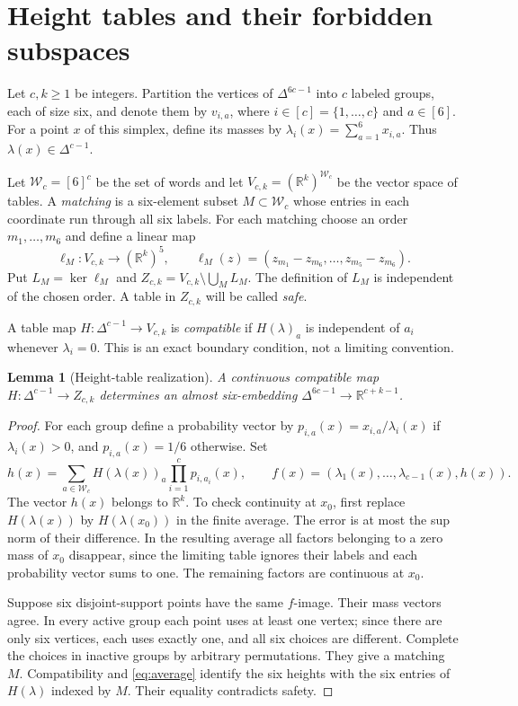 \documentclass[a4paper,11pt,reqno]{amsart}
\newcommand{\R}{\mathbb R}
\newtheorem{lemma}[theorem]{Lemma}
\theoremstyle{definition}
\theoremstyle{remark}
\numberwithin{equation}{section}
\begin{document}
\section{Height tables and their forbidden subspaces}\label{sec:tables}

Let $c,k\ge1$ be integers. Partition the vertices of $\Delta^{6c-1}$
into $c$ labeled groups, each of size six, and denote them by $v_{i,a}$,
where $i\in[c]=\{1,\ldots,c\}$ and $a\in[6]$.
For a point $x$ of this simplex, define its masses by
$\lambda_i(x)=\sum_{a=1}^6x_{i,a}$. Thus
$\lambda(x)\in\Delta^{c-1}$.

Let $\mathcal W_c=[6]^c$ be the set of words and let
$V_{c,k}=(\R^k)^{\mathcal W_c}$ be the vector space of tables.
A \emph{matching} is a six-element subset $M\subset\mathcal W_c$ whose
entries in each coordinate run through all six labels. For each matching
choose an order $m_1,\ldots,m_6$ and define a linear map
\[
 \ell_M:V_{c,k}\longrightarrow(\R^k)^5,
 \qquad
 \ell_M(z)=(z_{m_1}-z_{m_6},\ldots,z_{m_5}-z_{m_6}).
\]
Put $L_M=\ker\ell_M$ and
$Z_{c,k}=V_{c,k}\setminus\bigcup_M L_M$. The definition of $L_M$ is
independent of the chosen order. A table in $Z_{c,k}$ will be called
\emph{safe}.

A table map $H:\Delta^{c-1}\to V_{c,k}$ is \emph{compatible} if
$H(\lambda)_a$ is independent of $a_i$ whenever $\lambda_i=0$.
This is an exact boundary condition, not a limiting convention.

\begin{lemma}[Height-table realization]\label{lem:realization}
A continuous compatible map $H:\Delta^{c-1}\to Z_{c,k}$ determines an
almost six-embedding $\Delta^{6c-1}\to\R^{c+k-1}$.
\end{lemma}
\begin{proof}
For each group define a probability vector by
$p_{i,a}(x)=x_{i,a}/\lambda_i(x)$ if $\lambda_i(x)>0$, and
$p_{i,a}(x)=1/6$ otherwise. Set
\begin{equation}\label{eq:average}
 h(x)=\sum_{a\in\mathcal W_c}H(\lambda(x))_a
                         \prod_{i=1}^c p_{i,a_i}(x),
 \qquad
 f(x)=(\lambda_1(x),\ldots,\lambda_{c-1}(x),h(x)).
\end{equation}
The vector $h(x)$ belongs to $\R^k$. To check continuity at $x_0$, first
replace $H(\lambda(x))$ by $H(\lambda(x_0))$ in the finite average.
The error is at most the sup norm of their difference. In the resulting
average all factors belonging to a zero mass of $x_0$ disappear, since
the limiting table ignores their labels and each probability vector
sums to one. The remaining factors are continuous at $x_0$.

Suppose six disjoint-support points have the same $f$-image. Their
mass vectors agree. In every active group each point uses at least
one vertex; since there are only six vertices, each uses exactly one,
and all six choices are different. Complete the choices in inactive
groups by arbitrary permutations. They give a matching $M$. Compatibility
and \eqref{eq:average} identify the six heights with the six entries of
$H(\lambda)$ indexed by $M$. Their equality contradicts safety.
\end{proof}
\end{document}
